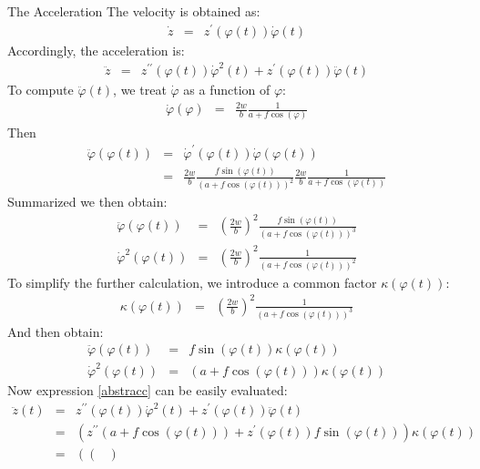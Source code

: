 \begin{chapter}{\titlestr}
\begin{section}{The Acceleration}
\label{ell_accel1}
The velocity is obtained as:
\begin{eqnarray*}
\dot{z} &=& z^\prime(\varphi(t))\dot{\varphi}(t)
\end{eqnarray*}
Accordingly, the acceleration is:
\begin{eqnarray}
\label{abstracc}
\ddot{z} &=& z^{\prime\prime}(\varphi(t))\dot{\varphi}^2(t)+z^\prime(\varphi(t))\ddot{\varphi}(t)
\end{eqnarray}
To compute $\ddot{\varphi}(t)$, we treat $\dot{\varphi}$ as a function of $\varphi$:
\begin{eqnarray*}
\dot{\varphi}(\varphi) &=& \frac{2w}{b}\frac{1}{a+f\cos(\varphi)}
\end{eqnarray*}
Then
\begin{eqnarray*}
\ddot{\varphi}(\varphi(t)) &=& \dot{\varphi}^\prime(\varphi(t))\dot{\varphi}(\varphi(t))\\
&=& \frac{2w}{b}\frac{f\sin(\varphi(t))}{(a+f\cos(\varphi(t)))^2}\frac{2w}{b}\frac{1}{a+f\cos(\varphi(t))}
\end{eqnarray*}
Summarized we then obtain:
\begin{eqnarray*}
\ddot{\varphi}(\varphi(t)) &=& \left(\frac{2w}{b}\right)^2\frac{f\sin(\varphi(t))}{(a+f\cos(\varphi(t)))^3}\\
\dot{\varphi}^2(\varphi(t)) &=& \left(\frac{2w}{b}\right)^2\frac{1}{(a+f\cos(\varphi(t)))^2}
\end{eqnarray*}
To simplify the further calculation, we introduce a common factor $\kappa(\varphi(t))$:
\begin{eqnarray*}
\kappa(\varphi(t)) &=& \left(\frac{2w}{b}\right)^2\frac{1}{(a+f\cos(\varphi(t)))^3}
\end{eqnarray*}
And then obtain:
\begin{eqnarray*}
\ddot{\varphi}(\varphi(t)) &=& f\sin(\varphi(t))\kappa(\varphi(t))\\
\dot{\varphi}^2(\varphi(t)) &=& (a+f\cos(\varphi(t)))\kappa(\varphi(t))
\end{eqnarray*}
Now expression \ref{abstracc} can be easily evaluated:
\begin{eqnarray*}
\ddot{z}(t) &=& z^{\prime\prime}(\varphi(t))\dot{\varphi}^2(t)+z^\prime(\varphi(t))\ddot{\varphi}(t)\\
&=& \left(z^{\prime\prime}(a+f\cos(\varphi(t)))+z^\prime(\varphi(t))f\sin(\varphi(t))\right)\kappa(\varphi(t))\\
&=&\left(
\begin{pmatrix}

\end{pmatrix}
\end{eqnarray*}
\end{section}
\end{chapter}
